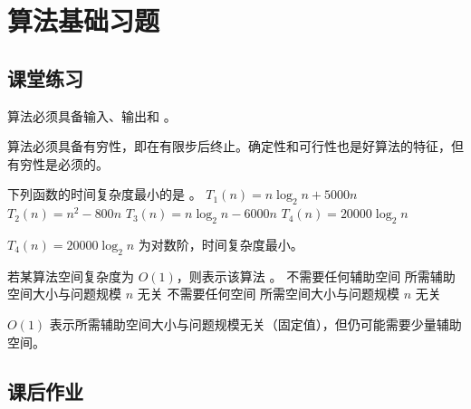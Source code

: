 \chapter{算法基础习题}

\section{课堂练习}

\begin{qitems}[showanalysis]

    \begin{bbox}
        \qitem 算法必须具备输入、输出和 \blankbox 。
        \begin{analysis}
            算法必须具备有穷性，即在有限步后终止。确定性和可行性也是好算法的特征，但有穷性是必须的。
        \end{analysis}
    \end{bbox}

    \begin{bbox}
        \qitem 下列函数的时间复杂度最小的是 \blankbox 。\textwater
        \fourchoices
            {$T_1(n)=n\log_2 n + 5000n$}
            {$T_2(n)=n^2 - 800n$}
            {$T_3(n)=n\log_2 n - 6000n$}
            {$T_4(n)=20000\log_2 n$}
        \begin{analysis}
            $T_4(n) = 20000\log_2 n$ 为对数阶，时间复杂度最小。
        \end{analysis}
    \end{bbox}

    \begin{bbox}
        \qitem 若某算法空间复杂度为 $O(1)$，则表示该算法 \blankbox 。
        \fourchoices
            {不需要任何辅助空间}
            {所需辅助空间大小与问题规模 $n$ 无关}
            {不需要任何空间}
            {所需空间大小与问题规模 $n$ 无关}
        \begin{analysis}
            $O(1)$ 表示所需辅助空间大小与问题规模无关（固定值），但仍可能需要少量辅助空间。
        \end{analysis}
    \end{bbox}

\end{qitems}

\section{课后作业}

